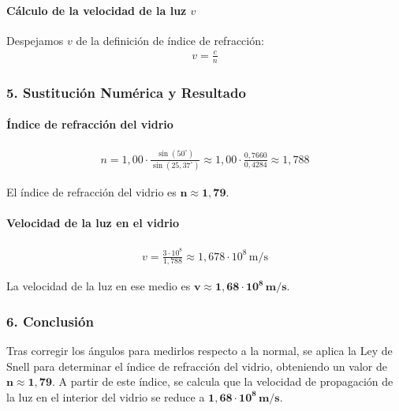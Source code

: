 \paragraph*{Cálculo de la velocidad de la luz $v$}
Despejamos $v$ de la definición de índice de refracción:
\begin{gather}
    v = \frac{c}{n}
\end{gather}

\subsubsection*{5. Sustitución Numérica y Resultado}
\paragraph*{Índice de refracción del vidrio}
\begin{gather}
    n = 1,00 \cdot \frac{\sin(50^\circ)}{\sin(25,37^\circ)} \approx 1,00 \cdot \frac{0,7660}{0,4284} \approx 1,788
\end{gather}
\begin{cajaresultado}
    El índice de refracción del vidrio es $\boldsymbol{n \approx 1,79}$.
\end{cajaresultado}
\paragraph*{Velocidad de la luz en el vidrio}
\begin{gather}
    v = \frac{3 \cdot 10^8}{1,788} \approx 1,678 \cdot 10^8 \, \text{m/s}
\end{gather}
\begin{cajaresultado}
    La velocidad de la luz en ese medio es $\boldsymbol{v \approx 1,68 \cdot 10^8 \, m/s}$.
\end{cajaresultado}

\subsubsection*{6. Conclusión}
\begin{cajaconclusion}
    Tras corregir los ángulos para medirlos respecto a la normal, se aplica la Ley de Snell para determinar el índice de refracción del vidrio, obteniendo un valor de $\mathbf{n \approx 1,79}$. A partir de este índice, se calcula que la velocidad de propagación de la luz en el interior del vidrio se reduce a $\mathbf{1,68 \cdot 10^8 \, m/s}$.
\end{cajaconclusion}


